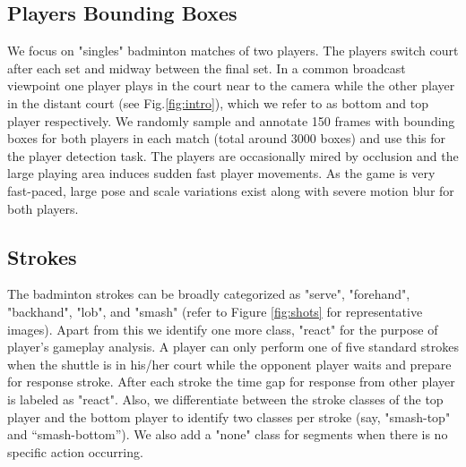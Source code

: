 \documentclass[runningheads,a4paper]{llncs}
\begin{document}
\subsection{Players Bounding Boxes}

We focus on "singles" badminton matches of two players. The players switch court after each set and midway between the final set. In a common broadcast viewpoint one player plays in the court near to the camera while the other player in the distant court (see Fig.\ref{fig:intro}), which we refer to as bottom and top player respectively. We randomly sample and annotate 150 frames with bounding boxes for both players in each match (total around 3000 boxes) and use this for the player detection task. The players are occasionally mired by occlusion and the large playing area induces sudden fast player movements. As the game is very fast-paced, large pose and scale variations exist along with severe motion blur for both players.

\subsection{Strokes}

The badminton strokes can be broadly categorized as "serve", "forehand", "backhand", "lob", and "smash" (refer to Figure \ref{fig:shots} for representative images). Apart from this we identify one more class, "react" for the purpose of player’s gameplay analysis. A player can only perform one of five standard strokes when the shuttle is in his/her court while the opponent player waits and prepare for response stroke. After each stroke the time gap for response from other player is labeled as "react". Also, we differentiate between the stroke classes of the top player and the bottom player to identify two classes per stroke (say, "smash-top" and “smash-bottom”). We also add a "none" class for segments when there is no specific action occurring.
\end{document}
